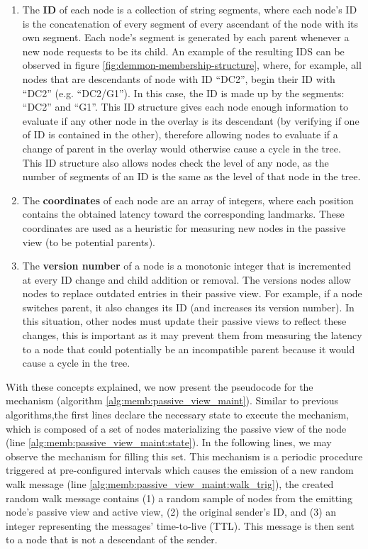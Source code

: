 \begin{enumerate}
    \item The \textbf{ID} of each node is a collection of string segments, where each node's ID is the concatenation of every segment of every ascendant of the node with its own segment. Each node's segment is generated by each parent whenever a new node requests to be its child. An example of the resulting IDS can be observed in figure \ref{fig:demmon-membership-structure}, where, for example, all nodes that are descendants of node with ID ``DC2'', begin their ID with ``DC2'' (e.g. ``DC2/G1''). In this case, the ID is made up by the segments: ``DC2'' and ``G1''. This ID structure gives each node enough information to evaluate if any other node in the overlay is its descendant (by verifying if one of ID is contained in the other), therefore allowing nodes to evaluate if a change of parent in the overlay would otherwise cause a cycle in the tree. This ID structure also allows nodes check the level of any node, as the number of segments of an ID is the same as the level of that node in the tree.
    
    \item The \textbf{coordinates} of each node are an array of integers, where each position contains the obtained latency toward the corresponding landmarks. These coordinates are used as a heuristic for measuring new nodes in the passive view (to be potential parents).
    
    \item The \textbf{version number} of a node is a monotonic integer that is incremented at every ID change and child addition or removal. The versions nodes allow nodes to replace outdated entries in their passive view. For example, if a node switches parent, it also changes its ID (and increases its version number). In this situation, other nodes must update their passive views to reflect these changes, this is important as it may prevent them from measuring the latency to a node that could potentially be an incompatible parent because it would cause a cycle in the tree.
\end{enumerate}

With these concepts explained, we now present the pseudocode for the mechanism (algorithm \ref{alg:memb:passive_view_maint}). Similar to previous algorithms,the first lines declare the necessary state to execute the mechanism, which is composed of a set of nodes materializing the passive view of the node (line \ref{alg:memb:passive_view_maint:state}). In the following lines, we may observe the mechanism for filling this set. This mechanism is a periodic procedure triggered at pre-configured intervals which causes the emission of a new random walk message (line \ref{alg:memb:passive_view_maint:walk_trig}), the created random walk message contains (1) a random sample of nodes from the emitting node's passive view and active view, (2) the original sender's ID, and (3) an integer representing the messages' time-to-live (TTL). This message is then sent to a node that is not a descendant of the sender.

